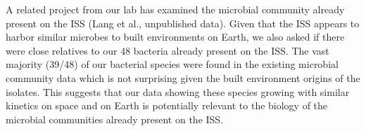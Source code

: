 A related project from our lab has examined the microbial community already present on the ISS (Lang et al., unpublished data). Given that the ISS appears to harbor similar microbes to built environments on Earth, we also asked if there were close relatives to our 48 bacteria already present on the ISS. The vast majority (39/48) of our bacterial species were found in the existing microbial community data which is not surprising given the built environment origins of the isolates. This suggests that our data showing these species growing with similar kinetics on space and on Earth is potentially relevant to the biology of the microbial communities already present on the ISS.

